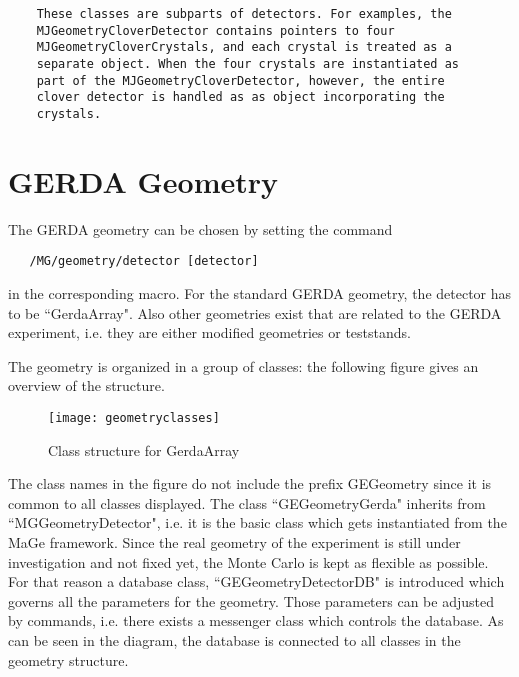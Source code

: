 \begin{lstlisting}
    These classes are subparts of detectors. For examples, the
    MJGeometryCloverDetector contains pointers to four
    MJGeometryCloverCrystals, and each crystal is treated as a
    separate object. When the four crystals are instantiated as
    part of the MJGeometryCloverDetector, however, the entire
    clover detector is handled as as object incorporating the
    crystals.
   \end{lstlisting}
  

\section{GERDA Geometry}

The GERDA geometry can be chosen by setting the command
 
\begin{lstlisting}
   /MG/geometry/detector [detector]
                    \end{lstlisting}
 in the corresponding macro. For the
standard GERDA geometry, the detector has to be ``GerdaArray". Also
other geometries exist that are related to the GERDA experiment,
i.e. they are either modified geometries or teststands.


The geometry is organized in a group of classes: the following figure gives an
overview of the structure.  
\begin{figure}
\begin{center}
\texttt{[image: geometryclasses]}
\end{center}
\caption{Class structure for GerdaArray}
\end{figure}
The class names in the figure do not
include the prefix GEGeometry since it is common to all classes
displayed. The class ``GEGeometryGerda" inherits from
``MGGeometryDetector", i.e. it is the basic class which gets
instantiated from the MaGe framework. Since the real geometry of the
experiment is still under investigation and not fixed yet, the Monte
Carlo is kept as flexible as possible. For that reason a database
class, ``GEGeometryDetectorDB" is introduced which governs all the
parameters for the geometry. Those parameters can be adjusted by
commands, i.e. there exists a messenger class which controls the
database. As can be seen in the diagram, the database is connected to
all classes in the geometry structure.


